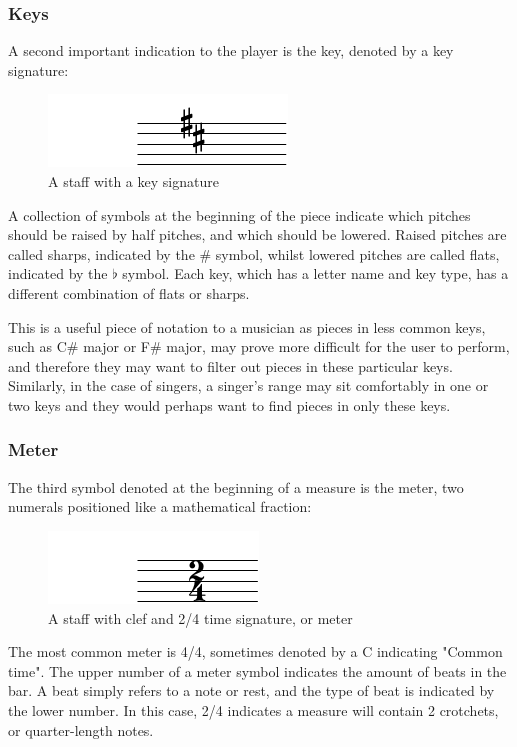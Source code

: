 \subsubsection{Keys}
A second important indication to the player is the key, denoted by a key signature:
\begin{figure}[htbp]
    \centering
        \includegraphics{key-crop.pdf}
    \caption{A staff with a key signature}
\end{figure}

A collection of symbols at the beginning of the piece indicate which pitches should be raised by half pitches, and which should be lowered. Raised pitches are called sharps, indicated by the \# symbol, whilst lowered pitches are called flats, indicated by the $\flat$ symbol. Each key, which has a letter name and key type, has a different combination of flats or sharps.

This is a useful piece of notation to a musician as pieces in less common keys, such as C\# major or F\# major, may prove more difficult for the user to perform, and therefore they may want to filter out pieces in these particular keys. Similarly, in the case of singers, a singer's range may sit comfortably in one or two keys and they would perhaps want to find pieces in only these keys. 

\subsubsection{Meter}
The third symbol denoted at the beginning of a measure is the meter, two numerals positioned like a mathematical fraction:

\begin{figure}[htbp]
    \centering
        \includegraphics{meter-crop.pdf}
    \caption{A staff with clef and 2/4 time signature, or meter}
\end{figure}

The most common meter is 4/4, sometimes denoted by a C indicating "Common time". The upper number of a meter symbol indicates the amount of beats in the bar. A beat simply refers to a note or rest, and the type of beat is indicated by the lower number. In this case, 2/4 indicates a measure will contain 2 crotchets, or quarter-length notes.

